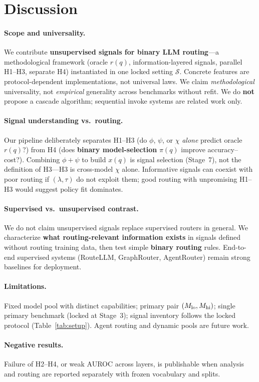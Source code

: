 \section{Discussion}
\label{sec:discussion}

\paragraph{Scope and universality.}
We contribute \textbf{unsupervised signals for binary LLM routing}---a methodological framework (oracle $r(q)$, information-layered signals, parallel H1--H3, separate H4) instantiated in one locked setting $\mathcal{S}$.
Concrete features are protocol-dependent implementations, not universal laws.
We claim \emph{methodological} universality, not \emph{empirical} generality across benchmarks without refit.
We do \textbf{not} propose a cascade algorithm; sequential invoke systems are related work only.

\paragraph{Signal understanding vs.\ routing.}
Our pipeline deliberately separates H1--H3 (do $\phi$, $\psi$, or $\chi$ \emph{alone} predict oracle $r(q)$?) from H4 (does \textbf{binary model-selection} $\pi(q)$ improve accuracy--cost?).
Combining $\phi{+}\psi$ to build $x(q)$ is signal selection (Stage~7), not the definition of H3---H3 is cross-model $\chi$ alone.
Informative signals can coexist with poor routing if $(\lambda,\tau)$ do not exploit them; good routing with unpromising H1--H3 would suggest policy fit dominates.

\paragraph{Supervised vs.\ unsupervised contrast.}
We do not claim unsupervised signals replace supervised routers in general.
We characterize \textbf{what routing-relevant information exists} in signals defined without routing training data, then test simple \textbf{binary routing} rules.
End-to-end supervised systems (RouteLLM, GraphRouter, AgentRouter) remain strong baselines for deployment.

\paragraph{Limitations.}
Fixed model pool with distinct capabilities; primary pair $(M_{\mathrm{lo}},M_{\mathrm{hi}})$; single primary benchmark (locked at Stage~3); signal inventory follows the locked protocol (Table~\ref{tab:setup}).
Agent routing and dynamic pools are future work.

\paragraph{Negative results.}
Failure of H2--H4, or weak AUROC across layers, is publishable when analysis and routing are reported separately with frozen vocabulary and splits.

